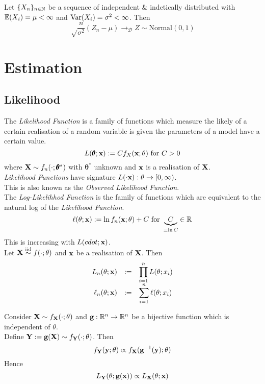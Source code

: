 \documentclass[11pt,a4paper]{article}
\begin{document}
Let $\{X_n\}_{n\in\mathbb{N}}$ be a sequence of independent \& indetically distributed with $\mathbb{E}(X_i)=\mu<\infty$ and $\mathrm{Var}(X_i)=\sigma^2<\infty$. Then\\
$$\sqrt\frac{n}{\sigma^2}(Z_n-\mu)\to_\mathcal{D}Z\sim\text{Normal}(0,1)$$

\section{Estimation}

\subsection{Likelihood}

The \textit{Likelihood Function} is a family of functions which measure the likely of a certain realisation of a random variable is given the parameters of a model have a certain value.
$$L(\pmb{\theta};\textbf{x}):=Cf_X(\textbf{x};\theta)\text{ for }C>0$$
where $\textbf{X}\sim f_n(\cdot;\pmb{\theta}^*)$ with $\pmb{\theta}^*$ unknown and $\textbf{x}$ is a realisation of $\textbf{X}$.\\
\nb \textit{Likelihood Functions} have signature $L(\cdot\textbf{x}):\theta\to[0,\infty)$.\\
\nb This is also known as the \textit{Observed Likelihood Function}.\\

The \textit{Log-Likelihhod Function} is the family of functions which are equivalent to the natural log of the \textit{Likelihood Function}.
$$\ell(\theta;\textbf{x}):=\ln f_n(\textbf{x};\theta)+C\text{ for }\underbrace{C}_{\equiv\ln C}\in\mathbb{R}$$
\nb This is increasing with $L(cdot;\textbf{x})$.\\

Let $\textbf{X}\overset{\text{iid}}{\sim} f(\cdot;\theta)$ and $\textbf{x}$ be a realisation of $\textbf{X}$. Then
\[\begin{array}{rcl}
L_n(\theta;\textbf{x})&:=&{\displaystyle\prod_{i=1}^nL(\theta;x_i)}\\
\ell_n(\theta;\textbf{x})&:=&{\displaystyle\sum_{i=1}^n\ell(\theta;x_i)}
\end{array}\]

Consider $\textbf{X}\sim f_{\textbf{X}}(\cdot;\theta)$ and $\textbf{g}:\mathbb{R}^n\to\mathbb{R}^n$ be a bijective function which is independent of $\theta$.\\
Define $\textbf{Y}:=\textbf{g}(\textbf{X})\sim f_\textbf{Y}(\cdot;\theta)$. Then
$$f_\textbf{Y}(\textbf{y};\theta)\propto f_{\textbf{X}}(\textbf{g}^{-1}(\textbf{y});\theta)$$
Hence
$$L_\textbf{Y}(\theta;\textbf{g}(\textbf{x}))\propto L_{\textbf{X}}(\theta;\textbf{x})$$
\end{document}
